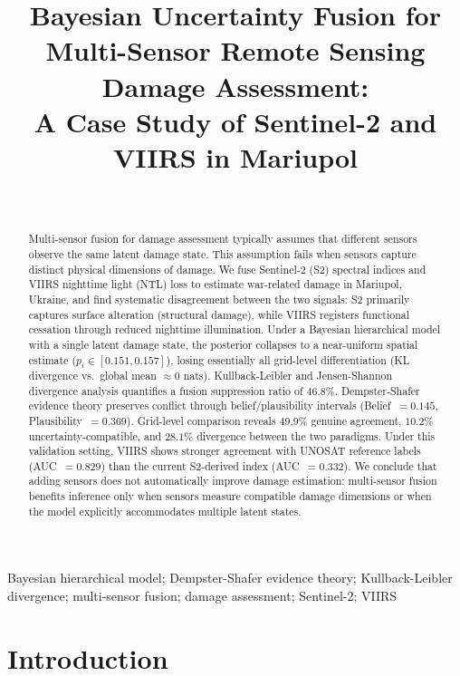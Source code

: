 \documentclass[wcp]{jmlr}
\title[Bayesian Fusion for Multi-Sensor Damage Assessment]{Bayesian Uncertainty Fusion for Multi-Sensor Remote Sensing
Damage Assessment:\\A Case Study of Sentinel-2 and VIIRS in Mariupol}
\author{
  \Name{Author Name} \Email{author@university.edu}\\
  \addr{Department of Statistics, University Name}
}
\begin{document}
\makeatletter
\let \@jmlrpages \@empty
\makeatother

\maketitle

\begin{abstract}
Multi-sensor fusion for damage assessment typically assumes that different
sensors observe the same latent damage state. This assumption fails when
sensors capture distinct physical dimensions of damage. We fuse
Sentinel-2 (S2) spectral indices and VIIRS nighttime light (NTL) loss to
estimate war-related damage in Mariupol, Ukraine, and find systematic
disagreement between the two signals: S2 primarily captures surface
alteration (structural damage), while VIIRS registers functional cessation
through reduced nighttime illumination. Under a Bayesian hierarchical model
with a single latent damage state, the posterior collapses to a
near-uniform spatial estimate ($p_i \in [0.151, 0.157]$), losing
essentially all grid-level differentiation (KL divergence vs.\ global mean
$\approx 0$ nats). Kullback-Leibler and Jensen-Shannon divergence analysis
quantifies a fusion suppression ratio of $46.8\%$. Dempster-Shafer evidence
theory preserves conflict through belief/plausibility intervals
(Belief~$=0.145$, Plausibility~$=0.369$). Grid-level comparison reveals
$49.9\%$ genuine agreement, $10.2\%$ uncertainty-compatible, and $28.1\%$
divergence between the two paradigms. Under this validation setting, VIIRS
shows stronger agreement with UNOSAT reference labels (AUC~$=0.829$) than
the current S2-derived index (AUC~$=0.332$). We conclude that adding
sensors does not automatically improve damage estimation: multi-sensor
fusion benefits inference only when sensors measure compatible damage
dimensions or when the model explicitly accommodates multiple latent states.
\end{abstract}

\begin{keywords}
Bayesian hierarchical model; Dempster-Shafer evidence theory;
Kullback-Leibler divergence; multi-sensor fusion; damage assessment;
Sentinel-2; VIIRS
\end{keywords}

\section{Introduction}\label{sec:intro}
\end{document}
